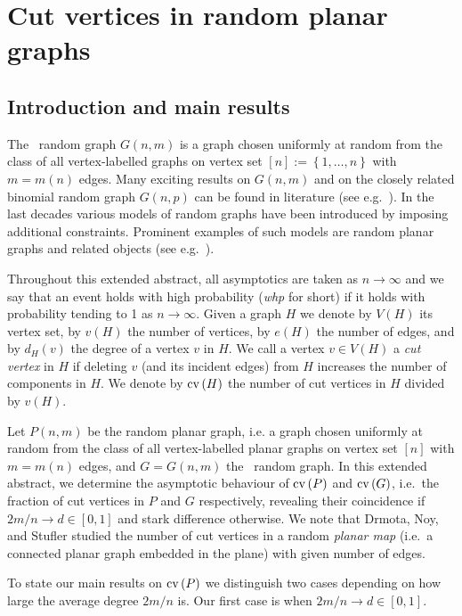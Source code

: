 
\chapter{Cut vertices in random planar graphs}\label{cha:cut_vertices}

\section{Introduction and main results}
The \ER\ random graph $G(n,m)$ is a graph chosen uniformly at random from the class of all vertex-labelled graphs on vertex set $[n]:=\left\{1, \ldots, n\right\}$ with $m=m(n)$ edges. Many exciting results on $G(n,m)$ and on the closely related binomial random graph $G(n,p)$ can be found in literature (see e.g.~\cite{Bollobas2001}). In the last decades various models of random graphs have been introduced by imposing additional constraints. Prominent examples of such models are random planar graphs and related objects (see e.g.~\cite{GerkeMcDiarmidStegerWeissl2005,GimenezNoy2009,KangLuczak2012,KangMosshammerSpruessel2020}).
	
Throughout this extended abstract, all asymptotics are taken as $n\to\infty$ and we say that an event holds with high probability ({\em whp} for short) if it holds with probability tending to 1 as $n\to\infty$. Given a graph $H$ we denote by $V(H)$ its vertex set, by $v(H)$ the number of vertices, by $e(H)$ the number of edges, and by $d_H(v)$ the degree of a vertex $v$ in $H$. We call a vertex $v\in V(H)$ a {\em cut vertex} in $H$ if deleting $v$ (and its incident edges) from $H$ increases the number of components in $H$. We denote by $\operatorname{cv}\left(H\right)$ the number of cut vertices in $H$ divided by  $v(H)$.
	
Let $P(n,m)$ be the random planar graph, i.e. a graph chosen uniformly at random from the class of all vertex-labelled planar graphs on vertex set $[n]$ with $m=m(n)$ edges, and $G=G(n,m)$ the \ER\ random graph.
In this extended abstract, we determine the asymptotic behaviour of  $\operatorname{cv}\left(P\right)$ and $\operatorname{cv}\left(G\right)$, i.e.~the fraction of  cut vertices in $P$ and $G$ respectively, revealing their coincidence if $2m/n \to d\in[0,1]$ and stark difference otherwise. We note that  Drmota, Noy, and Stufler  \cite{DrmotaNoyStufler2020} studied  the number of cut vertices in a random {\em planar  map} (i.e.~a connected planar graph embedded in the plane) with given number of edges. 
	
To state our main results on $\operatorname{cv}\left(P\right)$ we distinguish two cases depending on how large the average degree $2m/n$ is. Our first case is when $2m/n \to d\in[0,1]$. 
	
